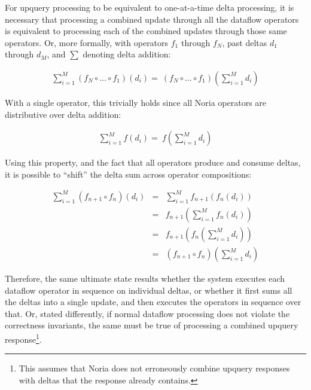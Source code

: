 For upquery processing to be equivalent to one-at-a-time delta processing, it is
necessary that processing a combined update through all the dataflow operators
is equivalent to processing each of the combined updates through those same
operators. Or, more formally, with operators $f_1$ through $f_N$, past deltas
$d_1$ through $d_M$, and $\sum$ denoting delta addition:

\begin{eqnarray*}
  \sum^M_{i=1}\left(f_N \circ \dots \circ f_1\right)\left(d_i\right) = \
  \left(f_N \circ \dots \circ f_1\right)\left(\sum^M_{i=1}d_i\right)
\end{eqnarray*}

With a single operator, this trivially holds since all Noria operators are
distributive over delta addition:

\begin{eqnarray*}
  \sum^M_{i=1}f\left(d_i\right) = \
  f\left(\sum^M_{i=1}d_i\right)
\end{eqnarray*}

Using this property, and the fact that all operators produce and consume deltas,
it is possible to ``shift'' the delta sum across operator compositions:

\begin{eqnarray*}
  \sum^M_{i=1}\left(f_{n+1} \circ f_n\right)\left(d_i\right) &=& \sum^M_{i=1}f_{n+1}\left(f_n\left(d_i\right)\right) \\
  &=& f_{n+1}\left(\sum^M_{i=1}f_n\left(d_i\right)\right) \\
  &=& f_{n+1}\left(f_n\left(\sum^M_{i=1}d_i\right)\right) \\
  &=& \left(f_{n+1} \circ f_n\right)\left(\sum^M_{i=1}d_i\right)
\end{eqnarray*}

Therefore, the same ultimate state results whether the system executes each
dataflow operator in sequence on individual deltas, or whether it first sums all
the deltas into a single update, and then executes the operators in sequence
over that. Or, stated differently, if normal dataflow processing does not
violate the correctness invariants, the same must be true of processing a
combined upquery response\footnote{This assumes that Noria does not erroneously
combine upquery responses with deltas that the response already contains.}.

